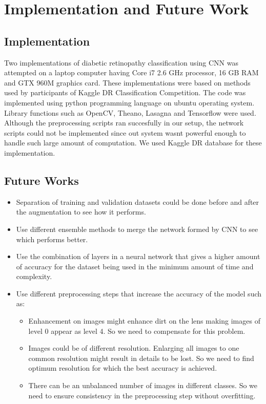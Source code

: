 \documentclass[12pt]{report}
\begin{document}
\chapter{Implementation and Future Work}
\section{Implementation}
Two implementations of diabetic retinopathy classification using CNN was attempted on a laptop computer having  
Core i7 2.6 GHz processor, 16 GB RAM and GTX 960M graphics card. These implementations were based on methods used by participants of Kaggle DR Classification Competition. The code was implemented using python programming language on ubuntu operating system. Library functions such as OpenCV, Theano, Lasagna and Tensorflow were used. Although the preprocessing scripts ran succesfully in our setup, the network scripts could not be implemented since out system wasnt powerful enough to handle such large amount of computation. We used Kaggle DR database for these implementation. 
\section{Future Works}
\begin{itemize}
\item Separation of training and validation datasets could be done before and after the augmentation to see how it performs.
\item Use different ensemble methods to merge the network formed by CNN to see which performs better.
\item Use the combination of layers in a neural network that gives a higher amount of accuracy for the dataset being used in the minimum amount of time and complexity.
\item Use different preprocessing steps that increase the accuracy of the model such as:
\begin{itemize}
\item Enhancement on images might enhance dirt on the lens making images of level 0 appear as level 4. So we need to compensate for this problem.
\item Images could be of different resolution. Enlarging all images to one common resolution might result in details to be lost. So we need to find optimum resolution for which the best accuracy is achieved.
\item There can be an unbalanced number of images in different classes. So we need to ensure consistency in the preprocessing step without overfitting.
\end{itemize}
\end{itemize}
\end{document}
